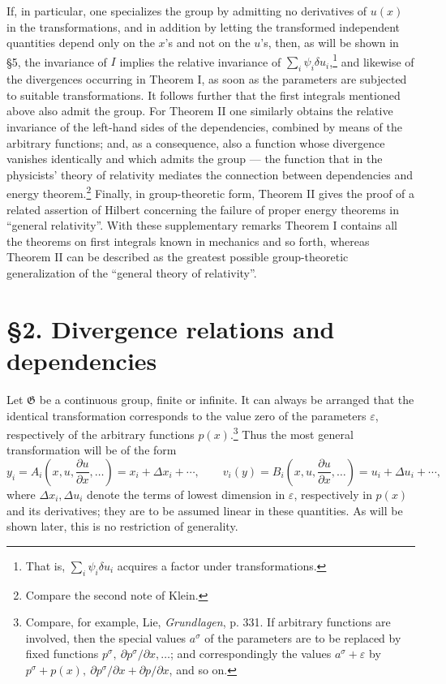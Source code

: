 \documentclass[11pt]{article}
\newcommand{\D}{\Delta}
\providecommand{\eps}{\varepsilon}
\providecommand{\G}{\mathfrak G}
\providecommand{\p}{\partial}
\providecommand{\p}{\partial}
\begin{document}
If, in particular, one specializes the group by admitting no derivatives of \(u(x)\) in the transformations, and in addition by letting the transformed independent quantities depend only on the \(x\)'s and not on the \(u\)'s, then, as will be shown in \S{}5, the invariance of \(I\) implies the relative invariance of \(\sum_i\psi_i\delta u_i\),\footnote{That is, \(\sum_i\psi_i\delta u_i\) acquires a factor under transformations.} and likewise of the divergences occurring in Theorem I, as soon as the parameters are subjected to suitable transformations. It follows further that the first integrals mentioned above also admit the group. For Theorem II one similarly obtains the relative invariance of the left-hand sides of the dependencies, combined by means of the arbitrary functions; and, as a consequence, also a function whose divergence vanishes identically and which admits the group --- the function that in the physicists' theory of relativity mediates the connection between dependencies and energy theorem.\footnote{Compare the second note of Klein.} Finally, in group-theoretic form, Theorem II gives the proof of a related assertion of Hilbert concerning the failure of proper energy theorems in ``general relativity''. With these supplementary remarks Theorem I contains all the theorems on first integrals known in mechanics and so forth, whereas Theorem II can be described as the greatest possible group-theoretic generalization of the ``general theory of relativity''.

\section*{\S{}2. Divergence relations and dependencies}

Let \(\G\) be a continuous group, finite or infinite. It can always be arranged that the identical transformation corresponds to the value zero of the parameters \(\eps\), respectively of the arbitrary functions \(p(x)\).\footnote{Compare, for example, Lie, \emph{Grundlagen}, p. 331. If arbitrary functions are involved, then the special values \(a^\sigma\) of the parameters are to be replaced by fixed functions \(p^\sigma,\ \p p^\sigma/\p x,\ldots\); and correspondingly the values \(a^\sigma+\eps\) by \(p^\sigma+p(x),\ \p p^\sigma/\p x+\p p/\p x\), and so on.} Thus the most general transformation will be of the form
\[
y_i=A_i\!\left(x,u,\frac{\p u}{\p x},\ldots\right)=x_i+\D x_i+\cdots,\qquad
v_i(y)=B_i\!\left(x,u,\frac{\p u}{\p x},\ldots\right)=u_i+\D u_i+\cdots,
\]
where \(\D x_i,\D u_i\) denote the terms of lowest dimension in \(\eps\), respectively in \(p(x)\) and its derivatives; they are to be assumed linear in these quantities. As will be shown later, this is no restriction of generality.
\end{document}
